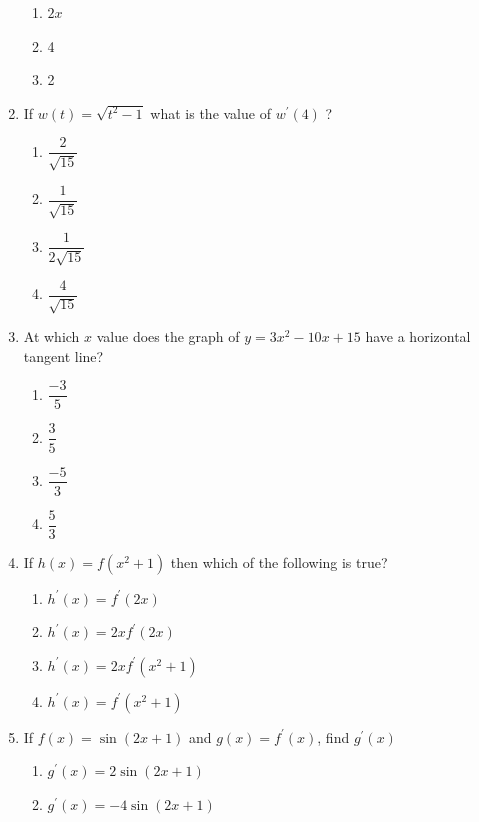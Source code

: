 \documentclass{article}
\begin{document}
\begin{enumerate}
\begin{minipage}[t]{\linewidth}
\begin{enumerate}
			\item  $2 x$
			\item  4
			\item  2
		\end{enumerate}
	\end{minipage}
	\item
	\begin{minipage}[t]{\linewidth}
		If \(w(t)=\sqrt{t^{2}-1}\) what is the value of \(w^{\prime}(4)\) ?\\[0.1em]
		\begin{enumerate}
		\itemsep1em
			\item  $\dfrac{2}{\sqrt{15}}$
			\item  $\dfrac{1}{\sqrt{15}}$
			\item  $\dfrac{1}{2 \sqrt{15}}$
			\item  $\dfrac{4}{\sqrt{15}}$
		\end{enumerate}
	\end{minipage}
	\item
	\begin{minipage}[t]{\linewidth}
		At which \(x\) value does the graph of \(y=3 x^{2}-10 x+15\) have a
horizontal tangent line?\\[0.1em]
		\begin{enumerate}
		\itemsep1em
			\item  $\dfrac{-3}{5}$
			\item  $\dfrac{3}{5}$
			\item  $\dfrac{-5}{3}$
			\item  $\dfrac{5}{3}$
		\end{enumerate}
	\end{minipage}
	\item
	\begin{minipage}[t]{\linewidth}
		If \(h(x)=f\left(x^{2}+1\right)\) then which of the following is true?\\[0.1em]
		\begin{enumerate}
		\itemsep1em
			\item  $h^{\prime}(x)=f^{\prime}(2 x)$
			\item  $h^{\prime}(x)=2 x f^{\prime}(2 x)$
			\item  $h^{\prime}(x)=2x f^{\prime}\left(x^{2}+1\right)$

			\item  $h^{\prime}(x)=f^{\prime}\left(x^{2}+1\right)$
		\end{enumerate}
	\end{minipage}
	\item
	\begin{minipage}[t]{\linewidth}
		If \(f(x)=\sin \left(2x +1\right)\) and \(g(x) = f^{\prime}(x)\), find
\(g^{\prime}(x)\)\\[0.1em]
		\begin{enumerate}
		\itemsep1em
			\item  $g^{\prime}(x) = 2 \sin (2x + 1)$
			\item  $g^{\prime}(x) = -4 \sin (2x + 1)$


\end{enumerate}
\end{minipage}
\end{enumerate}
\end{document}
